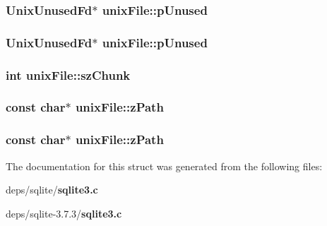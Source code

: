 \subsubsection{\setlength{\rightskip}{0pt plus 5cm}\bf{Unix\-Unused\-Fd}$\ast$ \bf{unix\-File::p\-Unused}}\label{structunixFile_61c6d843efb9753bdf50f32573b47ba4}


\subsubsection{\setlength{\rightskip}{0pt plus 5cm}\bf{Unix\-Unused\-Fd}$\ast$ \bf{unix\-File::p\-Unused}}\label{structunixFile_61c6d843efb9753bdf50f32573b47ba4}


\subsubsection{\setlength{\rightskip}{0pt plus 5cm}int \bf{unix\-File::sz\-Chunk}}\label{structunixFile_24c4f3167db378848613692ddbf2e0af}


\subsubsection{\setlength{\rightskip}{0pt plus 5cm}const char$\ast$ \bf{unix\-File::z\-Path}}\label{structunixFile_44a0acf237d5fc319231fee28da9755a}


\subsubsection{\setlength{\rightskip}{0pt plus 5cm}const char$\ast$ \bf{unix\-File::z\-Path}}\label{structunixFile_44a0acf237d5fc319231fee28da9755a}




The documentation for this struct was generated from the following files:\begin{CompactItemize}
\item 
deps/sqlite/\bf{sqlite3.c}\item 
deps/sqlite-3.7.3/\bf{sqlite3.c}\end{CompactItemize}
